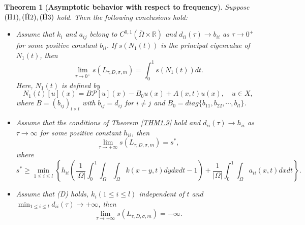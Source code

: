 \documentclass[11pt,reqno]{amsart}
\newtheorem{theorem}{Theorem}[section]
\numberwithin{equation}{section}
\begin{document}
\begin{theorem}[\textbf{Asymptotic behavior with respect to frequency}]\label{THM1.10}
Suppose ${\rm (H1),(\tilde{H}2),(\tilde{H}3)}$ hold. Then the following conclusions hold:
\begin{itemize}[leftmargin=0.8cm]
%
\item[(i)]
%
Assume that $k_{i}$ and $a_{ij}$ belong to $C^{0,1}(\bar{\Omega} \times \mathbb{R})$ and $d_{ii}(\tau) \to b_{ii} $ as $\tau\to 0^{+}$ for some positive constant $b_{ii}$. If $s(N_{1}(t))$ is the principal eigenvalue of $N_{1}(t)$, then
\begin{equation*}
\lim_{\tau \to 0^{+}} s(L_{\tau,D,\sigma,m}) = \int_{0}^{1} s(N_{1}(t)) dt.
\end{equation*}
Here, $N_{1}(t)$ is defined by
\begin{equation*}
N_{1}(t)[u](x)= B\mathcal{P}[u](x)-B_{0}u(x)+A(x,t)u(x),\quad u\in X,
\end{equation*}
where $B= (b_{ij})_{l\times l}$ with $b_{ij}=d_{ij}$ for $i\neq j$ and $B_{0}= diag\{b_{11},b_{22},\cdots,b_{ll}\}$.
%
%
\item[(ii)] Assume that the conditions of Theorem \ref{THM1.9} hold and $d_{ii}(\tau) \to h_{ii} $ as $\tau\to \infty$ for some positive constant $h_{ii}$, then
\begin{equation*}
\lim_{\tau \to +\infty} s(L_{\tau,D,\sigma,m}) = s^{*},
\end{equation*}
where
\begin{equation*}
s^{*} \geq \min_{1\leq i \leq l} \left\{ h_{ii} \left( \frac{1}{|\Omega|} \int_{0}^{1} \int_{\Omega} \int_{\Omega} k(x-y,t)dydxdt - 1 \right) + \frac{1}{|\Omega|} \int_{0}^{1} \int_{\Omega} a_{ii}(x,t) dx dt \right\} .
\end{equation*}

%
%
\item[(iii)]
Assume that (D) holds, $k_{i} (1\leq i \leq l)$ independent of $t$ and $\min_{1\leq i \leq l}d_{ii}(\tau)\to +\infty$, then
\begin{equation*}
\lim_{\tau \to +\infty} s(L_{\tau,D,\sigma,m}) = -\infty.
\end{equation*}
\end{itemize}
\end{theorem}
\end{document}
